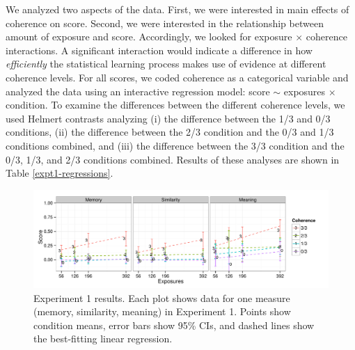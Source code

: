 \documentclass[man,floatsintext]{apa6}
\begin{document}
We analyzed two aspects of the data. First, we were interested in main effects of coherence on score. Second, we were interested in the relationship between amount of exposure and score. Accordingly, we looked for exposure $\times$ coherence interactions. A significant interaction would indicate a difference in how \emph{efficiently} the statistical learning process makes use of evidence at different coherence levels. For all scores, we coded coherence as a categorical variable and analyzed the data using an interactive regression model: score $\sim$ exposures $\times$ condition. To examine the differences between the different coherence levels, we used Helmert contrasts analyzing (i) the difference between the 1/3 and 0/3 conditions, (ii) the difference between the 2/3 condition and the 0/3 and 1/3 conditions combined, and (iii) the difference between the 3/3 condition and the 0/3, 1/3, and 2/3 conditions combined. Results of these analyses are shown in Table \ref{expt1-regressions}.

\begin{figure}[h]
  \begin{center}
    \includegraphics[width=1.0\linewidth]{x1.pdf}
    \caption{Experiment 1 results. Each plot shows data for one measure (memory, similarity, meaning) in Experiment 1. Points show condition means, error bars show 95\% CIs, and dashed lines show the best-fitting linear regression.}
    \label{expt1-results}
  \end{center}
\end{figure}

\newcommand{\ww}{\color{white}{*}}
\newcommand\T{\rule{0pt}{2.1ex}}
\end{document}
